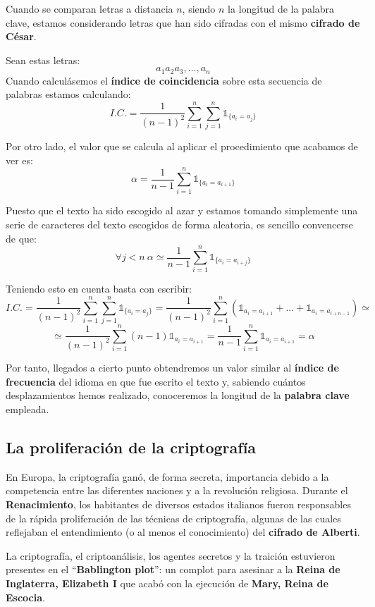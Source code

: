 \documentclass[nochap]{apuntesURJC}
\begin{document}
Cuando se comparan letras a distancia $n$, siendo $n$ la longitud de la palabra clave, estamos considerando letras que han sido cifradas con el mismo \textbf{cifrado de César}.

Sean estas letras:
\[a_1a_2a_3,...,a_n\]
Cuando calculásemos el \textbf{índice de coincidencia} sobre esta secuencia de palabras estamos calculando:
\[I.C. = \frac{1}{(n-1)^2}\sum_{i=1}^n\sum_{j=1}^n\mathbb{1}_{\{a_i=a_j\}}\]

Por otro lado, el valor que se calcula al aplicar el procedimiento que acabamos de ver es:
\[α = \frac{1}{n-1} \sum_{i=1}^n \mathbb{1}_{\{a_i=a_{i+1}\}}\]

Puesto que el texto ha sido escogido al azar y estamos tomando simplemente una serie de caracteres del texto escogidos de forma aleatoria, es sencillo convencerse de que:
\[\forall j < n \ α \simeq \frac{1}{n-1}\sum_{i=1}^n\mathbb{1}_{\{a_i=a_{i+j}\}}\]

Teniendo esto en cuenta basta con escribir:
\[I.C. = \frac{1}{(n-1)^2}\sum_{i=1}^n\sum_{j=1}^n\mathbb{1}_{\{a_i=a_j\}} = \frac{1}{(n-1)^2}\sum_{i=1}^n \left( \mathbb{1}_{a_i=a_{i+1}} + ... + \mathbb{1}_{a_i=a_{i+n-1}}\right)\simeq\]
\[\simeq \frac{1}{(n-1)^2}\sum_{i=1}^n(n-1)\mathbb{1}_{a_i=a_{i+1}} = \frac{1}{n-1}\sum_{i=1}^n\mathbb{1}_{a_i=a_{i+1}}=α\]

Por tanto, llegados a cierto punto obtendremos un valor similar al \textbf{índice de frecuencia} del idioma en que fue escrito el texto y, sabiendo cuántos desplazamientos hemos realizado, conoceremos la longitud de la \textbf{palabra clave} empleada.

\subsection{La proliferación de la criptografía}
En Europa, la criptografía ganó, de forma secreta, importancia debido a la competencia entre las diferentes naciones y a la revolución religiosa. Durante el \textbf{Renacimiento}, los habitantes de diversos estados italianos  fueron responsables de la rápida proliferación de las técnicas de criptografía, algunas de las cuales reflejaban el entendimiento (o al menos el conocimiento) del \textbf{cifrado de Alberti}.

La criptografía, el criptoanálisis, los agentes secretos y la traición estuvieron presentes en el ``\textbf{Bablington plot}'': un complot para asesinar a la \textbf{Reina de Inglaterra, Elizabeth I} que acabó con la ejecución de \textbf{Mary, Reina de Escocia}.
\end{document}
